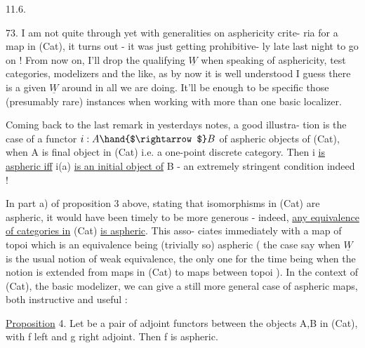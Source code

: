 
11.6.

73. I am not quite through yet with generalities on asphericity crite-%
ria for a map in (Cat), it turns out - it was just getting prohibitive-%
ly late last night to go on ! \margin{\P} From now on, I'll drop the qualifying
$\underline{W}$ when speaking of asphericity, test categories, modelizers and the
like, as by now it is well understood I guess there is a given $\underline{W}$ around
in all we are doing. It'll be enough to be specific  those (presumably
rare) instances when working with more than one basic localizer.

Coming back to the last remark in yesterdays notes, a good illustra-%
tion is the case of a functor $i : A \hand{$\rightarrow$} B$ of aspheric objects of (Cat),
when A is  final  object in (Cat) i.e. a one-point discrete
category. Then i \uline{is aspheric iff} i(a) \uline{is an initial object of} B - an
extremely stringent  condition indeed !

In part a) of proposition 3 above, stating that isomorphisms in
(Cat) are aspheric, it would have been timely to be more generous -
indeed, \uline{any equivalence of categories in} (Cat) \uline{is aspheric}. This asso-%
ciates immediately with a map of topoi which is an equivalence being
(trivially so) aspheric ( the case\hand{,} say\hand{,} when $\underline{W}$ is the usual notion of
weak equivalence, the only one for the time being when the notion is
extended from maps in (Cat) to maps between topoi ). In the context of
(Cat), the basic modelizer, we can give a still more general case of
aspheric maps, both instructive and useful :

\uline{Proposition} 4. Let
be a pair of adjoint functors between the objects A,B in (Cat), with f
left and g right adjoint. Then f is aspheric.

